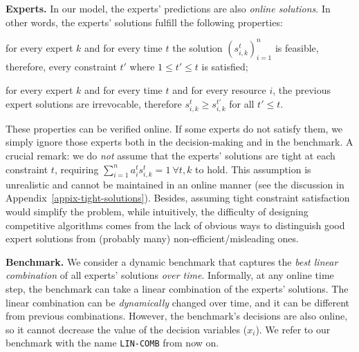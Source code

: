 \noindent \textbf{Experts.} \label{subsec:experts} In our model, the experts' predictions are also \emph{online solutions}. In other words, the experts' solutions
fulfill the following properties:
\begin{compactenum}
	\item for every expert $k$ and for every time $t$ the solution $(s_{i,k}^{t})_{i=1}^{n}$ is feasible, therefore, every constraint $t'$ where $1 \leq t' \leq t$ is satisfied;
	\item for every expert $k$ and for every time $t$ and for every resource $i$, the previous expert solutions are irrevocable, therefore $s_{i,k}^{t} \geq s_{i,k}^{t'}$ for all $t' \leq t$.
\end{compactenum}
These properties can be verified online. If some experts do not satisfy them, we simply ignore those experts both in the decision-making and in the benchmark.
A crucial remark: we do \emph{not} assume that the experts' solutions are tight at each constraint $t$, requiring $\sum_{i=1}^{n} a_{i}^{t} s_{i,k}^{t} = 1 ~ \forall t, k$ to hold.
This assumption is unrealistic and cannot be maintained in an online manner (see the discussion in Appendix~\ref{appix-tight-solutions}).
Besides, assuming tight constraint satisfaction would simplify the problem, while intuitively,
the difficulty of designing competitive algorithms comes from the lack of obvious ways to distinguish
good expert solutions from (probably many) non-efficient/misleading ones.

\noindent \textbf{Benchmark.}
We consider a dynamic benchmark that captures the \emph{best linear combination} of all experts' solutions \emph{over time}.
Informally, at any online time step, the benchmark can take a linear combination of the experts' solutions.
The linear combination can be \emph{dynamically} changed over time, and it can be different from previous combinations.
However, the benchmark's decisions are also online, so it cannot decrease the value of the decision variables ($x_{i}$).
We refer to our benchmark with the name \texttt{LIN-COMB} from now on.

